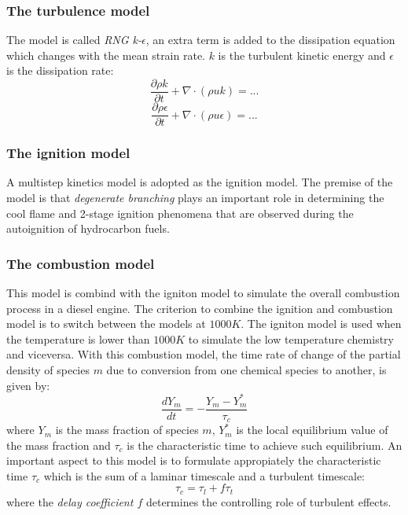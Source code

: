 \documentclass[12pt]{article}
\begin{document}
\subsubsection{The turbulence model}

The model is called \textit{RNG k-$\epsilon$}, an extra term is added to the dissipation equation which changes with the mean strain rate.
$k$ is the turbulent kinetic energy and $\epsilon$ is the dissipation rate:
\begin{equation}
    \frac{\partial \rho k}{\partial t}+\nabla\cdot(\rho u k)=...
\end{equation}
\begin{equation}
    \frac{\partial\rho\epsilon}{\partial t}+\nabla\cdot(\rho u \epsilon)=...
\end{equation}

\subsubsection{The ignition model}

A multistep kinetics model is adopted as the ignition model. The premise of the model is that \textit{degenerate branching} plays an important role in determining the cool flame and 2-stage ignition phenomena that are observed during the autoignition of hydrocarbon fuels.

\subsubsection{The combustion model}

This model is combind with the igniton model to simulate the overall combustion process in a diesel engine. The criterion to combine the ignition and combustion model is to switch between the models at $1000 K$. The igniton model is used when the temperature is lower than $1000 K$ to simulate the low temperature chemistry and viceversa. With this combustion model, the time rate of change of the partial density of species $m$ due to conversion from one chemical species to another, is given by:
\begin{equation}
    \frac{dY_{m}}{dt}=-\frac{Y_{m}-Y_{m}^{*}}{\tau_{c}}
\end{equation}
where $Y_{m}$ is the mass fraction of species $m$, $Y_{m}^{*}$ is the local equilibrium value of the mass fraction and $\tau_{c}$ is the characteristic time to achieve such equilibrium. An important aspect to this model is to formulate appropiately the characteristic time $\tau_{c}$ which is the sum of a laminar timescale and a turbulent timescale:
\begin{equation}
    \tau_{c}=\tau_{l}+f\tau_{t}
\end{equation}
where the \textit{delay coefficient $f$} determines the controlling role of turbulent effects.
\end{document}

